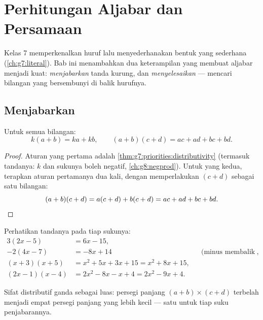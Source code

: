 \chapter{Perhitungan Aljabar dan Persamaan}\label{ch:g8:equations}

Kelas 7 memperkenalkan huruf lalu menyederhanakan bentuk yang
sederhana (\cref{ch:g7:literal}). Bab ini menambahkan dua keterampilan
yang membuat aljabar menjadi kuat: \emph{menjabarkan}  tanda
kurung, dan \emph{menyelesaikan } --- mencari bilangan yang
bersembunyi di balik hurufnya.

\section{Menjabarkan}

\begin{theorem}\label{thm:g8:equations:expand}
Untuk semua bilangan:
\[
k(a + b) = ka + kb,
\qquad
(a + b)(c + d) = ac + ad + bc + bd .
\]
\end{theorem}

\begin{proof}
Aturan yang pertama adalah \cref{thm:g7:priorities:distributivity}
(termasuk tandanya: $k$ dan sukunya boleh negatif,
\cref{ch:g8:negprod}). Untuk yang kedua, terapkan aturan pertamanya
dua kali, dengan memperlakukan $(c + d)$ sebagai satu bilangan:
\[
(a + b)(c + d) = a(c + d) + b(c + d) = ac + ad + bc + bd .
\qedhere
\]
\end{proof}

\begin{example}\label{ex:g8:equations:expand}
Perhatikan tandanya pada tiap sukunya:
\begin{align*}
3(2x - 5) &= 6x - 15, \\
-2(4x - 7) &= -8x + 14
&& \text{(minus membalik kedua tandanya)}, \\
(x + 3)(x + 5) &= x^2 + 5x + 3x + 15 = x^2 + 8x + 15, \\
(2x - 1)(x - 4) &= 2x^2 - 8x - x + 4 = 2x^2 - 9x + 4 .
\end{align*}
\end{example}

\begin{omfigure}

{\small Sifat distributif ganda sebagai luas: persegi panjang
$(a+b) \times (c+d)$ terbelah menjadi empat persegi panjang yang lebih
kecil --- satu untuk tiap suku penjabarannya.}
\end{omfigure}

